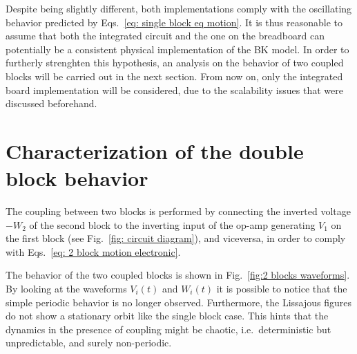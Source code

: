 Despite being slightly different, both implementations comply with the oscillating behavior predicted by
Eqs.~\ref{eq: single block eq motion}. It is thus reasonable to assume that both the integrated circuit and the one on the
breadboard can potentially be a consistent physical implementation of the BK model. In order to furtherly strenghten
this hypothesis, an analysis on the behavior of two coupled blocks will be carried out in the next section.
From now on, only the integrated board implementation will be considered, due to the scalability issues that were discussed
beforehand.


\section{Characterization of the double block behavior}\label{sec: double block characterization}

The coupling between two blocks is performed by connecting the inverted voltage $-W_2$ of the second block to the
inverting input of the op-amp generating $V_1$ on the first block (see Fig.~\ref{fig: circuit diagram}), and viceversa, in order
to comply with Eqs.~\ref{eq: 2 block motion electronic}.

The behavior of the two coupled blocks is shown in Fig.~\ref{fig:2 blocks waveforms}.
By looking at the waveforms $V_i(t)$ and $W_i(t)$ it is possible to notice that the simple periodic behavior
is no longer observed. Furthermore, the Lissajous figures do not show a stationary orbit like the single block case.
This hints that the dynamics in the presence of coupling might be chaotic, i.e.\ deterministic but unpredictable,
and surely non-periodic.

